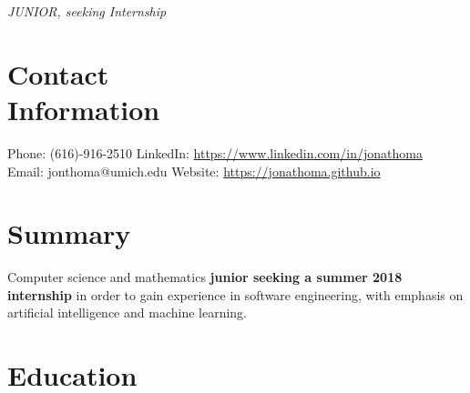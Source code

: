 \documentclass[margin,line]{resume}
\begin{document}
 {\hfill\textsl{JUNIOR, seeking Internship}}
      
\begin{resume}
    \vspace{-2.5mm}
    \section{\mysidestyle Contact\\Information}
    Phone: (616)-916-2510       \hfill LinkedIn: \url{https://www.linkedin.com/in/jonathoma} \\
    \noindent Email: jonthoma@umich.edu  \hfill Website: \url{https://jonathoma.github.io} \\ 
    \vspace{-1.5mm}
    
\sectionbreak
\vspace{-2.5mm}
    \section{\mysidestyle Summary}
    Computer science and mathematics \textbf{junior seeking a summer 2018 internship} in order to gain experience in software engineering, with emphasis on artificial intelligence and machine learning. \vspace{-2.5mm}\\ 
    
   \sectionbreak
   \vspace{-2.5mm}
    \section{\mysidestyle Education}


\end{resume}
\end{document}
